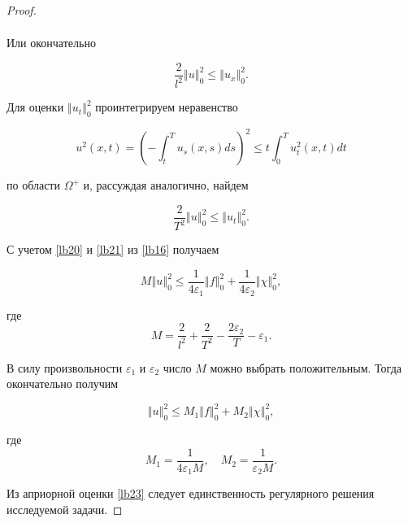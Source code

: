 \begin{proof}
\begin{multline}
\end{multline}

Или окончательно

\begin{equation}

\label{lb20}

\frac{2}{l^2} \left\Vert u \right\Vert_{0}^{2} \leqslant \left\Vert u_x \right\Vert_{0}^{2}.

\end{equation}

Для оценки $\left\Vert u_{t} \right\Vert_{0}^{2}$ проинтегрируем неравенство 

$$

u^2 (x, t)=\left(-\int _{t}^{T} u_s (x, s)ds\right)^2 \le t \int _{0}^{T} u_{t}^{2} (x, t)dt

$$  

по области $\Omega^{+}$ и, рассуждая аналогично, найдем

\begin{equation}

\label{lb21}

\frac{2}{T^2} \left\Vert u \right\Vert_{0}^{2} \leqslant \left\Vert u_t \right\Vert_{0}^{2}.

\end{equation}

С учетом  \eqref{lb20} и \eqref{lb21} из \eqref{lb16} получаем

\begin{equation}

\label{lb22}

M \left\Vert u \right\Vert_{0}^{2} \leqslant \frac{1}{4\varepsilon_1} \left\Vert f \right\Vert_{0}^{2}+\frac{1}{4\varepsilon_2} \left\Vert \chi \right\Vert_{0}^{2},

\end{equation}  

где $$M=\frac{2}{l^2}+\frac{2}{T^2}-\frac{2 \varepsilon_2}{T}-\varepsilon_1.$$



В силу произвольности $\varepsilon_1$ и $\varepsilon_2$ число $M$ можно выбрать положительным. Тогда окончательно получим

\begin{equation}

\label{lb23}

\left\Vert u \right\Vert_{0}^{2} \leqslant M_1 \left\Vert f \right\Vert_{0}^{2}+M_2 \left\Vert \chi \right\Vert_{0}^{2},

\end{equation}

где $$M_1=\frac{1}{4\varepsilon_1 M},\quad M_2=\frac{1}{\varepsilon_2 M}.$$



Из априорной оценки \eqref{lb23} следует единственность регулярного решения исследуемой задачи.

\end{proof}







